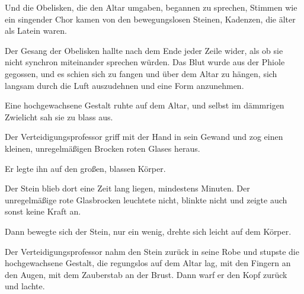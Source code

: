 Und die Obelisken, die den Altar umgaben, begannen zu sprechen, Stimmen wie ein singender Chor kamen von den bewegungslosen Steinen, Kadenzen, die älter als Latein waren.



Der Gesang der Obelisken hallte nach dem Ende jeder Zeile wider, als ob sie nicht synchron miteinander sprechen würden. Das Blut wurde aus der Phiole gegossen, und es schien sich zu fangen und über dem Altar zu hängen, sich langsam durch die Luft auszudehnen und eine Form anzunehmen.



Eine hochgewachsene Gestalt ruhte auf dem Altar, und selbst im dämmrigen Zwielicht sah sie zu blass aus.

Der Verteidigungsprofessor griff mit der Hand in sein Gewand und zog einen kleinen, unregelmäßigen Brocken roten Glases heraus.

Er legte ihn auf den großen, blassen Körper.

Der Stein blieb dort eine Zeit lang liegen, mindestens Minuten. Der unregelmäßige rote Glasbrocken leuchtete nicht, blinkte nicht und zeigte auch sonst keine Kraft an.

Dann bewegte sich der Stein, nur ein wenig, drehte sich leicht auf dem Körper.

Der Verteidigungsprofessor nahm den Stein zurück in seine Robe und stupste die hochgewachsene Gestalt, die regungslos auf dem Altar lag, mit den Fingern an den Augen, mit dem Zauberstab an der Brust. Dann warf er den Kopf zurück und lachte.


